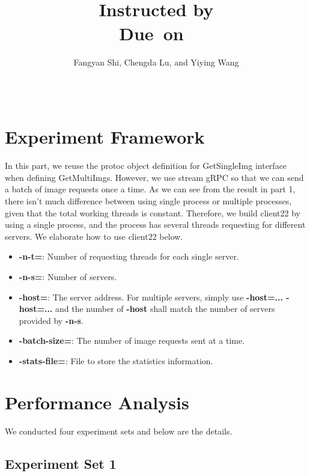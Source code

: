 \documentclass{article}
\title{\textmd{\bf \Title}\\{\large Instructed by \textit{\ClassInstructor}}\\\normalsize\vspace{0.1in}\small{Due\ on\ \DueDate}}
\date{}
\author{%
Fangyan Shi\affmark[1], Chengda Lu\affmark[2], and Yiying Wang\affmark[3]\\
\affaddr{\affmark[1]2021010892 \affmark[2]2021010899 \affmark[3]2020011604}\\
\email{\{\affmark[1]sfy21,\affmark[2]lucd21,\affmark[3]wangyiyi20\}@mails.tsinghua.edu.cn}\\
}
\begin{document}
\begin{spacing}{1.1}
\maketitle \thispagestyle{empty}

\newcommand{\FIGDIR}{} %

\section{Experiment Framework}

In this part, we reuse the protoc object definition for GetSingleImg interface when defining GetMultiImgs. However, we use stream gRPC so that we can send a batch of image requests once a time. As we can see from the result in part 1, there isn't much difference between using single process or multiple processes, given that the total working threads is constant. Therefore, we build client22 by using a single process, and the process has several threads requesting for different servers. We elaborate how to use client22 below.

\begin{itemize}
    \setlength\itemsep{1pt}
    \item \textbf{-n-t=}: Number of requesting threads for each single server.
    \item \textbf{-n-s=}: Number of servers.
    \item \textbf{-host=}: The server address. For multiple servers, simply use \textbf{-host=... -host=...} and the number of \textbf{-host} shall match the number of servers provided by \textbf{-n-s}.
    \item \textbf{-batch-size=}: The number of image requests sent at a time.
    \item \textbf{-stats-file=}: File to store the statistics information.
\end{itemize}


\section{Performance Analysis}

We conducted four experiment sets and below are the details.

\subsection{Experiment Set 1}


\end{spacing}
\end{document}
